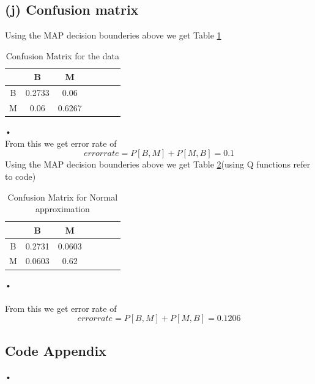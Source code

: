 \documentclass[a4paper,11pt]{article}
\begin{document}
\subsection*{(j) Confusion matrix}
Using the MAP decision bounderies above we get Table \ref{tab:1} \\
\begin{table}
	\centering
	\hspace*{-1cm}
	\begin{tabular}{ |c|c|c|c|c|c|c|} 
	\hline
	&B &M\\
	\hline
	 B&0.2733&0.06\\
	\hline
           M&0.06&0.6267\\
           \hline
	\end{tabular}
	\caption{Confusion Matrix for the data} \label{tab:1}
\end{table}•\\
From this we get error rate of \\
$$error rate  = P[B,M]+P[M,B] = 0.1$$
Using the MAP decision bounderies above we get Table \ref{tab:2}(using Q functions refer to code) \\
\begin{table}
	\centering
	\hspace*{-1cm}
	\begin{tabular}{ |c|c|c|c|c|c|c|} 
	\hline
	&B &M\\
	\hline

	 B&0.2731&0.0603\\
	\hline
           M&0.0603&0.62\\
           \hline
	\end{tabular}
	\caption{Confusion Matrix for Normal approximation} \label{tab:2}
\end{table}•\\\\
From this we get error rate of \\
$$error rate  = P[B,M]+P[M,B] = 0.1206$$

\clearpage
\newpage

\begin{appendix}
\section*{Code Appendix}
 
\end{appendix}•
\end{document}
